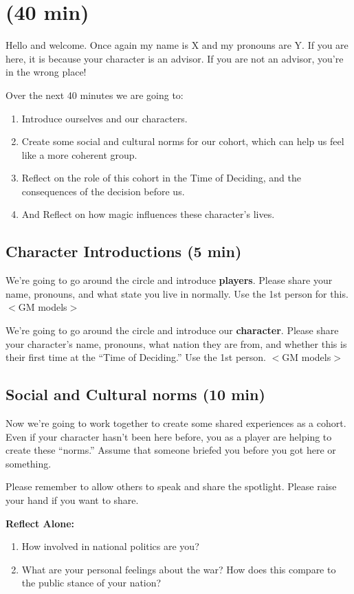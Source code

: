 \documentclass[green]{GL2020}
\begin{document}
\name{\gPreGameAdvisor{}}

\section*{(40 min)}

Hello and welcome. Once again my name is X and my pronouns are Y. If you are here, it is because your character is an advisor. If you are not an advisor, you're in the wrong place!

Over the next 40 minutes we are going to:
\begin{enumerate}
	\item Introduce ourselves and our characters.
	\item Create some social and cultural norms for our cohort, which can help us feel like a more coherent group.
	\item Reflect on the role of this cohort in the Time of Deciding, and the consequences of the decision before us.
	\item And Reflect on how magic influences these character’s lives.
\end{enumerate}

\subsection*{Character Introductions (5 min)}
We’re going to go around the circle and introduce \textbf{players}. Please share your name, pronouns, and what state you live in normally. Use the 1st person for this. $<$GM models$>$

We’re going to go around the circle and introduce our \textbf{character}. Please share your character’s name, pronouns, what nation they are from, and whether this is their first time at the ``Time of Deciding.'' Use the 1st person. $<$GM models$>$


\subsection*{Social and Cultural norms (10 min)}
Now we’re going to work together to create some shared experiences as a cohort. Even if your character hasn’t been here before, you as a player are helping to create these ``norms.'' Assume that someone briefed you before you got here or something.

Please remember to allow others to speak and share the spotlight.  Please raise your hand if you want to share.

\textbf{Reflect Alone:} 
\begin{enumerate}
	\item How involved in national politics are you?
	\item What are your personal feelings about the war? How does this compare to the public stance of your nation?
\end{enumerate}
\end{document}

